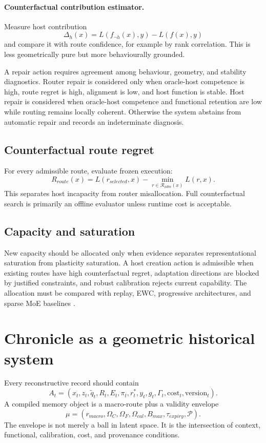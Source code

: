 \documentclass[11pt,a4paper]{article}
\begin{document}
\paragraph{Counterfactual contribution estimator.} Measure host contribution
\begin{equation}
\Delta_h(x)=L(f_{\neg h}(x),y)-L(f(x),y)
\end{equation}
and compare it with route confidence, for example by rank correlation. This is less geometrically pure but more behaviourally grounded.

A repair action requires agreement among behaviour, geometry, and stability diagnostics. Router repair is considered only when oracle-host competence is high, route regret is high, alignment is low, and host function is stable. Host repair is considered when oracle-host competence and functional retention are low while routing remains locally coherent. Otherwise the system abstains from automatic repair and records an indeterminate diagnosis.

\subsection{Counterfactual route regret}
For every admissible route, evaluate frozen execution:
\begin{equation}
R_{route}(x)=L(r_{selected},x)-\min_{r\in\mathcal{R}_{adm}(x)}L(r,x).
\end{equation}
This separates host incapacity from router misallocation. Full counterfactual search is primarily an offline evaluator unless runtime cost is acceptable.

\subsection{Capacity and saturation}
New capacity should be allocated only when evidence separates representational saturation from plasticity saturation. A host creation action is admissible when existing routes have high counterfactual regret, adaptation directions are blocked by justified constraints, and robust calibration rejects current capability. The allocation must be compared with replay, EWC, progressive architectures, and sparse MoE baselines \cite{kirkpatrick2017ewc,shazeer2017moe,fedus2022switch}.

\section{Chronicle as a geometric historical system}
Every reconstructive record should contain
\begin{equation}
A_t=(x_t,z_t,\tilde q_t,R_t,E_t,\pi_t,r_t^*,y_t,g_t,\Gamma_t,\mathrm{cost}_t,\mathrm{version}_t).
\end{equation}
A compiled memory object is a macro-route plus a validity envelope
\begin{equation}
\mu=(r_{macro},\Omega_C,\Omega_F,\Omega_{cal},B_{max},\tau_{expiry},\mathcal{P}).
\end{equation}
The envelope is not merely a ball in latent space. It is the intersection of context, functional, calibration, cost, and provenance conditions.
\end{document}
